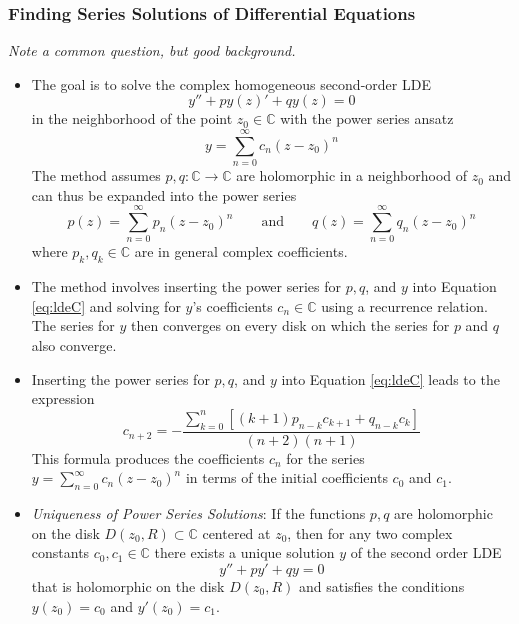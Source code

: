 \documentclass[11pt, a4paper]{article}
\newcommand{\question}[1]{\textit{#1}\vspace{2mm}}
\newcommand{\C}{\mathbb{C}} %
\begin{document}
\subsubsection{Finding Series Solutions of Differential Equations}
\question{Note a common question, but good background.}
\begin{itemize}
	\item The goal is to solve the complex homogeneous second-order LDE
	\begin{equation}
		y'' + py(z)' + qy(z) = 0	\label{eq:ldeC}
	\end{equation}
	in the neighborhood of the point $ z_{0} \in \C $ with the power series ansatz 
	\begin{equation*}
		y = \sum_{n=0}^{\infty}c_n(z-z_0)^n
	\end{equation*}
	The method assumes $ p, q: \C \to \C  $ are holomorphic in a neighborhood of $ z_{0} $ and can thus be expanded into the power series
	\begin{equation*}
		p(z) = \sum_{n= 0}^{\infty} p_n (z-z_{0})^n \qquad \text{and} \qquad q(z) = \sum_{n=0}^{\infty} q_n (z-z_{0})^n
	\end{equation*}
	where $ p_k, q_k \in \C $ are in general complex coefficients. 
	
	\item The method involves inserting the power series for $ p, q $, and $ y $ into Equation \ref{eq:ldeC} and solving for $ y $'s coefficients $ c_n \in \C $ using a recurrence relation. The series for $ y $ then converges on every disk on which the series for $ p $ and $ q $ also converge.
	
	\item Inserting the power series for $ p, q $, and $ y $ into Equation \ref{eq:ldeC} leads to the expression
	\begin{equation*}
		c_{n+2} = - \frac{\sum_{k=0}^{n}\left[(k+1)p_{n-k}c_{k+1} + q_{n-k}c_{k} \right]}{(n+2)(n+1)}
	\end{equation*}
	This formula produces the coefficients $ c_{n} $ for the series $ y = \sum_{n=0}^{\infty}c_{n}(z-z_{0})^{n} $ in terms of the initial coefficients $ c_{0} $ and $ c_{1} $.
	
	\item \textit{Uniqueness of Power Series Solutions}: If the functions $ p, q $ are holomorphic on the disk $ D(z_0, R) \subset \C $ centered at $ z_{0} $, then for any two complex constants $ c_0, c_1 \in \C $ there exists a unique solution $ y $ of the second order LDE 
	\begin{equation*}
		y'' + py' + qy = 0
	\end{equation*}
	that is holomorphic on the disk $ D(z_0, R) $ and satisfies the conditions $ y(z_0) = c_0 $ and $ y'(z_0) = c_1 $.
\end{itemize}
\end{document}
